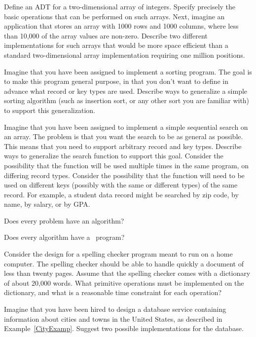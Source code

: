 \begin{exercises}
\item
{}
Define an ADT
for a two-dimensional array of integers.
Specify precisely the basic operations that
can be performed on such arrays.
Next, imagine an application that stores an array with 1000 rows and
1000 columns, where less than 10,000 of the array values are non-zero.
Describe two different implementations for such arrays that would be
more space efficient than a standard two-dimensional array
implementation requiring one million positions.

\item
Imagine that you have been assigned to implement a sorting
program.
The goal is to make this program general purpose, in that you don't
want to define in advance what record or key types are used.
Describe ways to generalize a simple sorting algorithm (such as
insertion sort, or any other sort you are familiar with) to support
this generalization.

\item
Imagine that you have been assigned to implement a simple
sequential search on an array.
The problem is that you want the search to be as general as possible.
This means that you need to support arbitrary record and key types.
Describe ways to generalize the search function to support this goal.
Consider the possibility that the function will be used multiple times
in the same program, on differing record types.
Consider the possibility that the function will need to be used on
different keys (possibly with the same or different types) of the same
record.
For example, a student data record might be searched by zip code, by
name, by salary, or by GPA.

\item
Does every problem have an algorithm?

\item
Does every algorithm have a \Lang\ program?

\item
Consider the design for a spelling checker program
meant to run on a home computer.
The spelling checker should be able to handle quickly a document of
less than twenty pages.
Assume that the spelling checker comes with a dictionary of about
20,000 words.
What primitive operations must be implemented
on the dictionary, and
what is a reasonable time constraint for each operation?

\item
Imagine that you have been hired to design a database service
containing information about cities and towns in the United States, as 
described in Example~\ref{CityExamp}.
Suggest two possible implementations for the database.


\end{exercises}
